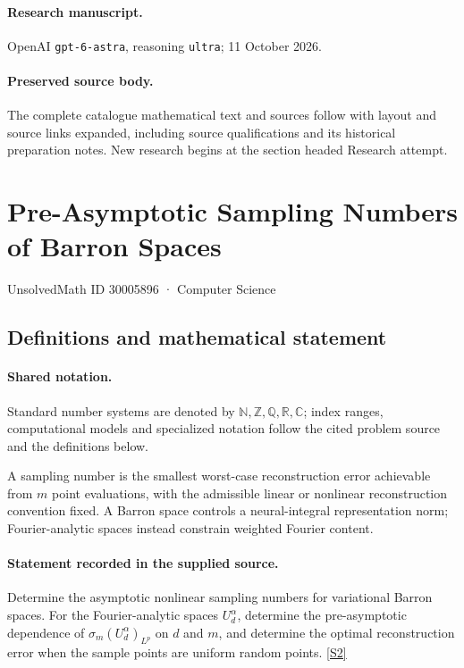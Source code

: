 \documentclass[11pt]{article}
\begin{document}
\paragraph{Research manuscript.} OpenAI \texttt{gpt-6-astra}, reasoning \texttt{ultra}; 11 October 2026.
\paragraph{Preserved source body.} The complete catalogue mathematical text and sources follow with layout and source links expanded, including source qualifications and its historical preparation notes. New research begins at the section headed Research attempt.

\section{Pre-Asymptotic Sampling Numbers of Barron Spaces}\label{30005896}
{\small UnsolvedMath ID 30005896 · Computer Science}
\subsection{Definitions and mathematical statement}

\paragraph{Shared notation.}Standard number systems are denoted by $\mathbb N,\mathbb Z,\mathbb Q,\mathbb R,\mathbb C$; index ranges, computational models and specialized notation follow the cited problem source and the definitions below.


A sampling number is the smallest worst-case reconstruction error achievable from $m$ point evaluations, with the admissible linear or nonlinear reconstruction convention fixed. A Barron space controls a neural-integral representation norm; Fourier-analytic spaces instead constrain weighted Fourier content.
\paragraph{Statement recorded in the supplied source.}
Determine the asymptotic nonlinear sampling numbers for variational Barron spaces. For the Fourier-analytic spaces $U_d^\alpha$, determine the pre-asymptotic dependence of $\sigma_m(U_d^\alpha)_{L^p}$ on $d$ and $m$, and determine the optimal reconstruction error when the sample points are uniform random points. \href{https://doi.org/10.4171/owr/2024/21}{[S2]}
\end{document}
